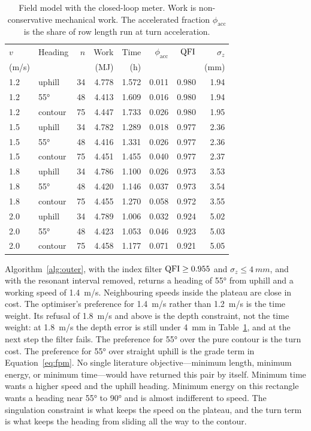 \begin{table}[ht]
\centering
\caption{Field model with the closed-loop meter. Work is non-conservative mechanical work. The accelerated fraction \(\phi_{\mathrm{acc}}\) is the share of row length run at turn acceleration.}
\label{tab:field}
\small
\begin{tabular}{@{}llrrrrrr@{}}
\toprule
\(v\) & Heading & \(n\) & Work & Time & \(\phi_{\mathrm{acc}}\) & \(\mathrm{QFI}\) & \(\sigma_z\) \\
(m/s) & & & (MJ) & (h) & & & (mm) \\
\midrule
1.2 & uphill & 34 & 4.778 & 1.572 & 0.011 & 0.980 & 1.94 \\
1.2 & \ang{55} & 48 & 4.413 & 1.609 & 0.016 & 0.980 & 1.94 \\
1.2 & contour & 75 & 4.447 & 1.733 & 0.026 & 0.980 & 1.95 \\
1.5 & uphill & 34 & 4.782 & 1.289 & 0.018 & 0.977 & 2.36 \\
1.5 & \ang{55} & 48 & 4.416 & 1.331 & 0.026 & 0.977 & 2.36 \\
1.5 & contour & 75 & 4.451 & 1.455 & 0.040 & 0.977 & 2.37 \\
1.8 & uphill & 34 & 4.786 & 1.100 & 0.026 & 0.973 & 3.53 \\
1.8 & \ang{55} & 48 & 4.420 & 1.146 & 0.037 & 0.973 & 3.54 \\
1.8 & contour & 75 & 4.455 & 1.270 & 0.058 & 0.972 & 3.55 \\
2.0 & uphill & 34 & 4.789 & 1.006 & 0.032 & 0.924 & 5.02 \\
2.0 & \ang{55} & 48 & 4.423 & 1.053 & 0.046 & 0.923 & 5.03 \\
2.0 & contour & 75 & 4.458 & 1.177 & 0.071 & 0.921 & 5.05 \\
\bottomrule
\end{tabular}
\end{table}

Algorithm~\ref{alg:outer}, with the index filter \(\mathrm{QFI}\ge 0.955\) and \(\sigma_z\le\SI{4}{mm}\), and with the resonant interval removed, returns a heading of \ang{55} from uphill and a working speed of \SI{1.4}{m/s}. Neighbouring speeds inside the plateau are close in cost. The optimiser's preference for \SI{1.4}{m/s} rather than \SI{1.2}{m/s} is the time weight. Its refusal of \SI{1.8}{m/s} and above is the depth constraint, not the time weight: at \SI{1.8}{m/s} the depth error is still under \SI{4}{mm} in Table~\ref{tab:field}, and at the next step the filter fails. The preference for \ang{55} over the pure contour is the turn cost. The preference for \ang{55} over straight uphill is the grade term in Equation~\eqref{eq:fpm}. No single literature objective---minimum length, minimum energy, or minimum time---would have returned this pair by itself. Minimum time wants a higher speed and the uphill heading. Minimum energy on this rectangle wants a heading near \ang{55} to \ang{90} and is almost indifferent to speed. The singulation constraint is what keeps the speed on the plateau, and the turn term is what keeps the heading from sliding all the way to the contour.

